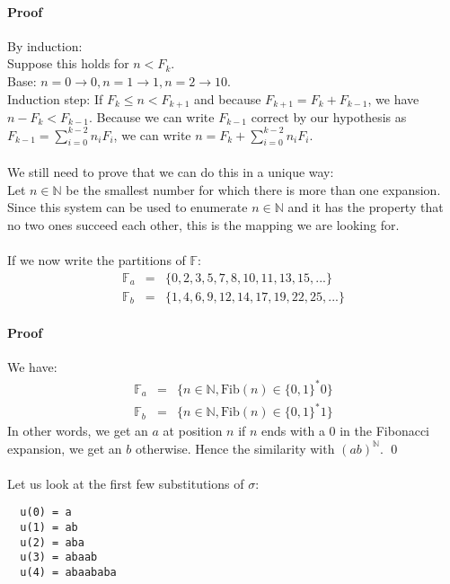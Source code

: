 \documentclass{article}
\begin{document}
\paragraph{Proof} By induction:\\
Suppose this holds for $n < F_k$.\\
Base: $n = 0 \rightarrow 0, n = 1 \rightarrow 1, n = 2 \rightarrow 10$.\\
Induction step: If $F_k \le n < F_{k + 1}$ and because
$F_{k + 1} = F_k + F_{k - 1}$, we have $n - F_k < F_{k - 1}$. Because we
can write $F_{k - 1}$ correct by our hypothesis as
$F_{k - 1} = \sum_{i = 0}^{k - 2} n_i F_i$, we can write
$n = F_k + \sum_{i = 0}^{k - 2} n_i F_i$.\\
\\
We still need to prove that we can do this in a unique way:\\
Let $n \in \mathbb{N}$ be the smallest number for which there is more than one
expansion. %
\\
Since this system can be used to enumerate $n \in \mathbb{N}$ and it has the
property that no two ones succeed each other, this is the mapping we are
looking for.\\
\\
If we now write the partitions of $\mathbb{F}$:
\begin{eqnarray*}
  \mathbb{F}_a &=& \{0, 2, 3, 5, 7, 8, 10, 11, 13, 15, ...\}\\
  \mathbb{F}_b &=& \{1, 4, 6, 9, 12, 14, 17, 19, 22, 25, ...\}
\end{eqnarray*}

\paragraph{Proof} We have:
\begin{eqnarray*}
  \mathbb{F}_a &=& \{n \in \mathbb{N}, \mathrm{Fib}(n) \in \{0, 1\}^* 0\}\\
  \mathbb{F}_b &=& \{n \in \mathbb{N}, \mathrm{Fib}(n) \in \{0, 1\}^* 1\}
\end{eqnarray*}
In other words, we get an $a$ at position $n$ if $n$ ends with a 0 in the
Fibonacci expansion, we get an $b$ otherwise. Hence the similarity with
$(ab)^{\mathbb{N}}$. \qed\\
\\
Let us look at the first few substitutions of $\sigma$:
\begin{verbatim}
  u(0) = a
  u(1) = ab
  u(2) = aba
  u(3) = abaab
  u(4) = abaababa
\end{verbatim}
\end{document}
